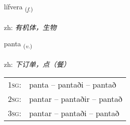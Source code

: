 \documentclass[frontgrid, backgrid]{flacards}\usepackage[]{graphicx}\usepackage[]{color}
\begin{document}
\renewcommand{\flhead}{\vskip5pt \fboxsep=0pt {\small\bfseries\footnotesize Nafnorð | 名词}}
\renewcommand{\fcfoot}{\vskip5pt \fboxsep=0pt \hspace{2pt}{\small\bfseries\footnotesize 2K}}

\renewcommand{\blhead}{\vskip5pt {\small\bfseries\footnotesize Nafnorð | 名词 }}
\renewcommand{\bcfoot}{\vskip5pt \hspace{2pt}{\small\bfseries\footnotesize 2K}}


{lífvera \small{\textsubscript{(\textit{f.})}} \\[1ex] %
\textphonetic{[livɛra]} \\
zh: \emph{有机体，生物} \\  [2ex]
\renewcommand*{\arraystretch}{0.8}
}

\renewcommand{\flhead}{\vskip5pt \fboxsep=0pt {\small\bfseries\footnotesize Sagnorð | 动词}}
\renewcommand{\fcfoot}{\vskip5pt \fboxsep=0pt \hspace{2pt}{\small\bfseries\footnotesize 2K}}

\renewcommand{\blhead}{\vskip5pt {\small\bfseries\footnotesize Sagnorð | 动词 }}
\renewcommand{\bcfoot}{\vskip5pt \hspace{2pt}{\small\bfseries\footnotesize 2K}}


{panta \small{\textsubscript{(\textit{v.})}} \\[1ex] %
\textphonetic{[pʰan̥ta]} \\
zh: \emph{下订单，点（餐）} \\  [2ex]
\renewcommand*{\arraystretch}{0.8}
\begin{tabular}{p{1cm}l}
\textsc{1sg}: & panta -- pantaði -- pantað \\ 
\textsc{2sg}: & pantar -- pantaðir -- pantað \\ 
\textsc{3sg}: & pantar -- pantaði -- pantað \\ 
\end{tabular}
}
\end{document}
